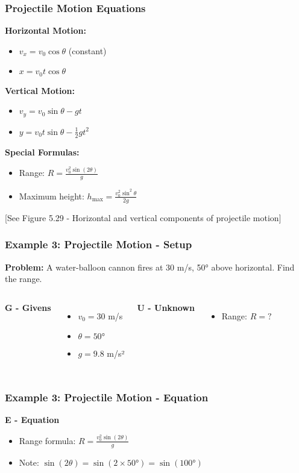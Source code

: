 \documentclass{beamer}
\begin{document}
\begin{frame}
\frametitle{Projectile Motion Equations}
\textbf{Horizontal Motion:}
\begin{itemize}
    \item $v_x = v_0 \cos\theta$ (constant) \pause
    \item $x = v_0 t \cos\theta$ \pause
\end{itemize}

\textbf{Vertical Motion:}
\begin{itemize}
    \item $v_y = v_0 \sin\theta - gt$ \pause
    \item $y = v_0 t \sin\theta - \frac{1}{2}gt^2$ \pause
\end{itemize}

\textbf{Special Formulas:}
\begin{itemize}
    \item Range: $R = \frac{v_0^2 \sin(2\theta)}{g}$ \pause
    \item Maximum height: $h_{\max} = \frac{v_0^2 \sin^2\theta}{2g}$
\end{itemize}

\vspace{0.2cm}
\alert{[See Figure 5.29 - Horizontal and vertical components of projectile motion]}
\end{frame}

\begin{frame}
\frametitle{Example 3: Projectile Motion - Setup}
\textbf{Problem:} A water-balloon cannon fires at 30 m/s, 50° above horizontal. Find the range.
\pause
\vspace{0.3cm}

\begin{columns}[T]
\textbf{G - Givens}
\begin{itemize}
\item $v_0 = 30$ m/s
\item $\theta = 50°$
\item $g = 9.8$ m/s²
\end{itemize}

\textbf{U - Unknown}
\begin{itemize}
\item Range: $R = ?$
\end{itemize}
\end{columns}
\end{frame}

\begin{frame}
\frametitle{Example 3: Projectile Motion - Equation}
\textbf{E - Equation}
\begin{itemize}
\item Range formula: $R = \frac{v_0^2 \sin(2\theta)}{g}$ \pause
\item Note: $\sin(2\theta) = \sin(2 \times 50°) = \sin(100°)$
\end{itemize}
\end{frame}
\end{document}

